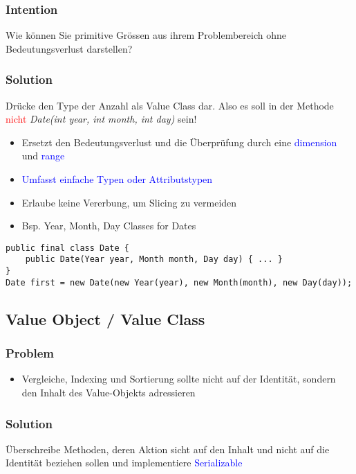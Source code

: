 \subsubsection{Intention}

Wie können Sie primitive Grössen aus ihrem Problembereich ohne Bedeutungsverlust darstellen?

\subsubsection{Solution}
Drücke den Type der Anzahl als Value Class dar. Also es soll in der Methode \textcolor{red}{nicht} \textit{Date(int year, int month, int day)} sein!\\

\begin{itemize}
    \item Ersetzt den Bedeutungsverlust und die Überprüfung durch eine \textcolor{blue}{dimension} und \textcolor{blue}{range}
    \item \textcolor{blue}{Umfasst einfache Typen oder Attributstypen}
    \item Erlaube keine Vererbung, um Slicing zu vermeiden
    \item Bsp. Year, Month, Day Classes for Dates
\end{itemize}
\begin{lstlisting}
public final class Date {
    public Date(Year year, Month month, Day day) { ... }
}
Date first = new Date(new Year(year), new Month(month), new Day(day));
\end{lstlisting}

\subsection{Value Object / Value Class}
\subsubsection{Problem}
\begin{itemize}
    \item Vergleiche, Indexing und Sortierung sollte nicht auf der Identität, sondern den Inhalt des Value-Objekts adressieren
\end{itemize}

\subsubsection{Solution}
Überschreibe Methoden, deren Aktion sicht auf den Inhalt und nicht auf die Identität beziehen sollen und implementiere \textcolor{blue}{Serializable}

